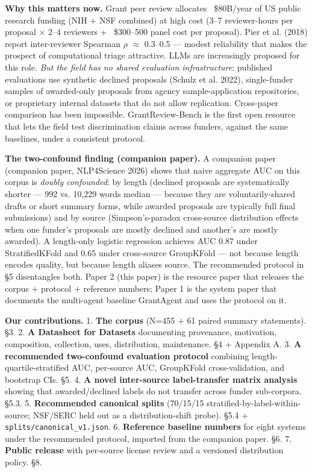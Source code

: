 \documentclass[11pt]{article}
\begin{document}
\textbf{Why this matters now.} Grant peer review allocates ~\$80B/year of US public research funding (NIH + NSF combined) at high cost (3--7 reviewer-hours per proposal $\times$ 2--4 reviewers + ~\$300--500 panel cost per proposal). Pier et al. (2018) report inter-reviewer Spearman $\rho$ $\approx$ 0.3--0.5 --- modest reliability that makes the prospect of computational triage attractive. LLMs are increasingly proposed for this role. \emph{But the field has no shared evaluation infrastructure}: published evaluations use synthetic declined proposals (Schulz et al. 2022), single-funder samples of awarded-only proposals from agency sample-application repositories, or proprietary internal datasets that do not allow replication. Cross-paper comparison has been impossible. GrantReview-Bench is the first open resource that lets the field test discrimination claims across funders, against the same baselines, under a consistent protocol.

\textbf{The two-confound finding (companion paper).} A companion paper (companion paper, NLP4Science 2026) shows that naive aggregate AUC on this corpus is \emph{doubly confounded}: by length (declined proposals are systematically shorter --- 992 vs. 10,229 words median --- because they are voluntarily-shared drafts or short summary forms, while awarded proposals are typically full final submissions) and by source (Simpson's-paradox cross-source distribution effects when one funder's proposals are mostly declined and another's are mostly awarded). A length-only logistic regression achieves AUC 0.87 under StratifiedKFold and 0.65 under cross-source GroupKFold --- not because length encodes quality, but because length aliases source. The recommended protocol in §5 disentangles both. Paper 2 (this paper) is the resource paper that releases the corpus + protocol + reference numbers; Paper 1 is the system paper that documents the multi-agent baseline GrantAgent and uses the protocol on it.

\textbf{Our contributions.}
1. \textbf{The corpus} (N=455 + 61 paired summary statements). §3.
2. \textbf{A Datasheet for Datasets} documenting provenance, motivation, composition, collection, uses, distribution, maintenance. §4 + Appendix A.
3. \textbf{A recommended two-confound evaluation protocol} combining length-quartile-stratified AUC, per-source AUC, GroupKFold cross-validation, and bootstrap CIs. §5.
4. \textbf{A novel inter-source label-transfer matrix analysis} showing that awarded/declined labels do not transfer across funder sub-corpora. §5.3.
5. \textbf{Recommended canonical splits} (70/15/15 stratified-by-label-within-source; NSF/SERC held out as a distribution-shift probe). §5.4 + \texttt{splits/canonical\_v1.json}.
6. \textbf{Reference baseline numbers} for eight systems under the recommended protocol, imported from the companion paper. §6.
7. \textbf{Public release} with per-source license review and a versioned distribution policy. §8.
\end{document}
